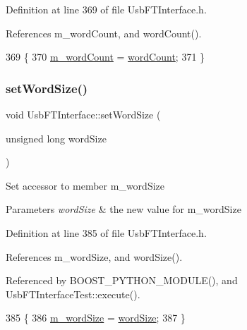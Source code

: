 Definition at line 369 of file Usb\+F\+T\+Interface.\+h.



References m\+\_\+word\+Count, and word\+Count().


\begin{DoxyCode}
369                                               \{
370     \hyperlink{classUsbFTInterface_a91c81850db2579afa6a5296e0bf0dbef}{m\_wordCount} = \hyperlink{classUsbFTInterface_a2acaf55e8c253f20e1f25a023c9238f4}{wordCount};
371   \}
\end{DoxyCode}
\mbox{\label{classUsbFTInterface_a1666f09d2b8994f8d13d6bc66f43b530}} 
\subsubsection{\texorpdfstring{set\+Word\+Size()}{setWordSize()}}
{\footnotesize\ttfamily void Usb\+F\+T\+Interface\+::set\+Word\+Size (\begin{DoxyParamCaption}\item[{unsigned long}]{word\+Size }\end{DoxyParamCaption})\hspace{0.3cm}{\ttfamily [inline]}}

Set accessor to member m\+\_\+word\+Size 
\begin{DoxyParams}{Parameters}
{\em word\+Size} & the new value for m\+\_\+word\+Size \\
\hline
\end{DoxyParams}


Definition at line 385 of file Usb\+F\+T\+Interface.\+h.



References m\+\_\+word\+Size, and word\+Size().



Referenced by B\+O\+O\+S\+T\+\_\+\+P\+Y\+T\+H\+O\+N\+\_\+\+M\+O\+D\+U\+L\+E(), and Usb\+F\+T\+Interface\+Test\+::execute().


\begin{DoxyCode}
385                                             \{
386     \hyperlink{classUsbFTInterface_a05ccc38a60c4b921b835238b604b38d8}{m\_wordSize} = \hyperlink{classUsbFTInterface_add098ede127a2089e3ac8ea615ed6d46}{wordSize};
387   \}
\end{DoxyCode}
\mbox{\label{classUsbFTInterface_ab2e58c22979ffa60adf609eca2af78d3}} 

